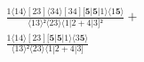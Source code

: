 \documentclass[varwidth, border=5pt]{standalone}
\begin{document}
\begin{my}
$\begin{gathered}
\scriptscriptstyle\frac{1⟨14⟩[23]⟨34⟩[34][𝟓|𝟓|1⟩⟨1𝟓⟩}{⟨13⟩²⟨23⟩⟨1|2+4|3]²} +\\
\scriptscriptstyle\frac{1⟨14⟩[23][𝟓|𝟓|1⟩⟨3𝟓⟩}{⟨13⟩²⟨23⟩⟨1|2+4|3]} \phantom{+}
\end{gathered}$
\end{my}
\end{document}
